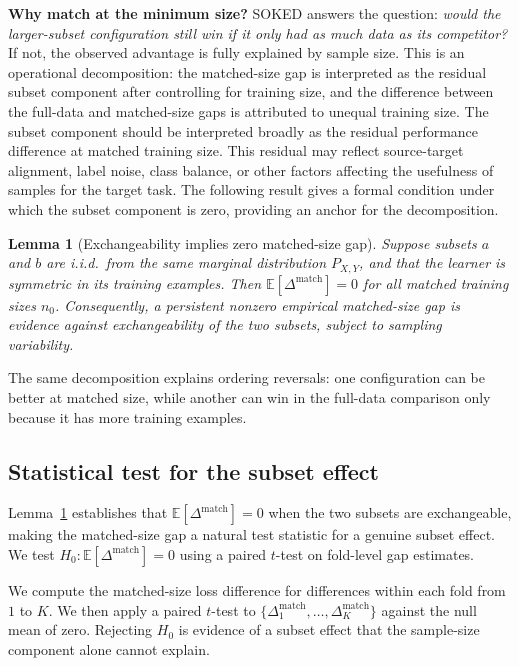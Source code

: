 \documentclass{article}
\newtheorem{lemma}{Lemma}
\begin{document}
\textbf{Why match at the minimum size?}
SOKED answers the question: \emph{would the larger-subset configuration still win if it only had as much data as its competitor?}
If not, the observed advantage is fully explained by sample size.
This is an operational decomposition: the matched-size gap is interpreted as the residual subset component after controlling for training size, and the difference between the full-data and matched-size gaps is attributed to unequal training size.
The subset component should be interpreted broadly as the residual performance difference at matched training size.
This residual may reflect source-target alignment, label noise, class balance, or other factors affecting the usefulness of samples for the target task.
The following result gives a formal condition under which the subset component is zero, providing an anchor for the decomposition.

\begin{lemma}[Exchangeability implies zero matched-size gap]
\label{lem:exchangeability}
Suppose subsets $a$ and $b$ are i.i.d.\ from the same marginal distribution $P_{X,Y}$, and that the learner is symmetric in its training examples.
Then $\mathbb{E}[\Delta^{\mathrm{match}}] = 0$ for all matched training sizes $n_0$.
Consequently, a persistent nonzero empirical matched-size gap is evidence against exchangeability of the two subsets, subject to sampling variability.
\end{lemma}

The same decomposition explains ordering reversals: one configuration can be better at matched size, while another can win in the full-data comparison only because it has more training examples.


\subsection{Statistical test for the subset effect}
\label{sec:ttest}
Lemma~\ref{lem:exchangeability} establishes that $\mathbb{E}[\Delta^{\mathrm{match}}] = 0$ when the two subsets are exchangeable, making the matched-size gap a natural test statistic for a genuine subset effect.
We test $H_0\colon \mathbb{E}[\Delta^{\mathrm{match}}] = 0$ using a paired $t$-test on fold-level gap estimates.

We compute the matched-size loss difference for differences within each fold from $1$ to $K$.
We then apply a paired $t$-test to $\{\Delta_1^{\mathrm{match}},\ldots,\Delta_K^{\mathrm{match}}\}$ against the null mean of zero.
Rejecting $H_0$ is evidence of a subset effect that the sample-size component alone cannot explain.
\end{document}
